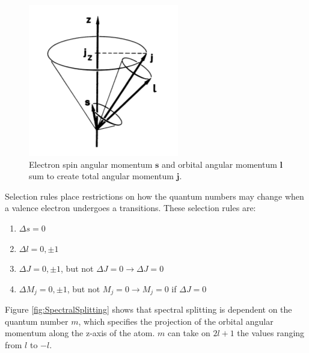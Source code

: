 \documentclass[twocolumn]{article}
\begin{document}
		\begin{figure}
			\centering
			\includegraphics[width=1.0\linewidth]{Images/TotalAngularMomentumDiagram}
			\caption{Electron spin angular momentum $\mathbf{s}$ and orbital angular momentum $\mathbf{l}$ sum to create total angular momentum $\mathbf{j}$.}
			\label{fig:TotalAngularMomentumDiagram}
		\end{figure}

		
		Selection rules place restrictions on how the quantum numbers may change when a valence electron undergoes a transitions.
		These selection rules are:
		\begin{enumerate}
			\item $\Delta s = 0$
			\item $\Delta l = 0, \pm1$
			\item $\Delta J = 0, \pm1$, but not $\Delta J = 0 \rightarrow \Delta J = 0$
			\item $\Delta M_j = 0, \pm1$, but not $M_j=0\rightarrow M_j=0$ if $\Delta J = 0$
		\end{enumerate}
		
		Figure \ref{fig:SpectralSplitting} shows that spectral splitting is dependent on the quantum number $m$, which specifies the projection of the orbital angular momentum along the z-axis of the atom.
		$m$ can take on $2l+1$ the values ranging from $l$ to $-l$.
		
\end{document}
